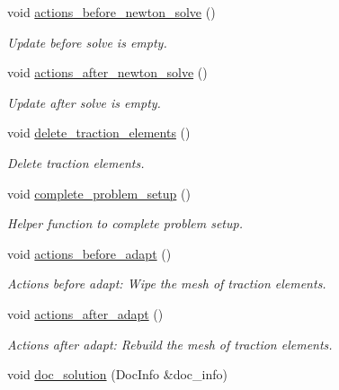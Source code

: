 \begin{DoxyCompactItemize}
void \hyperlink{classFourierDecomposedTimeHarmonicLinearElasticityProblem_ad9a3f48c3b399c4595f73d3f1e9a14ef}{actions\+\_\+before\+\_\+newton\+\_\+solve} ()
\begin{DoxyCompactList}\small\item\em Update before solve is empty. \end{DoxyCompactList}\item 
void \hyperlink{classFourierDecomposedTimeHarmonicLinearElasticityProblem_ac5c25fb4658eaef91104ef7be1b0d25e}{actions\+\_\+after\+\_\+newton\+\_\+solve} ()
\begin{DoxyCompactList}\small\item\em Update after solve is empty. \end{DoxyCompactList}\item 
void \hyperlink{classFourierDecomposedTimeHarmonicLinearElasticityProblem_ad51d1870683e0141c7854c583dd3916b}{delete\+\_\+traction\+\_\+elements} ()
\begin{DoxyCompactList}\small\item\em Delete traction elements. \end{DoxyCompactList}\item 
void \hyperlink{classFourierDecomposedTimeHarmonicLinearElasticityProblem_aeb3e1638026cb1cabf1b16a32496f63c}{complete\+\_\+problem\+\_\+setup} ()
\begin{DoxyCompactList}\small\item\em Helper function to complete problem setup. \end{DoxyCompactList}\item 
void \hyperlink{classFourierDecomposedTimeHarmonicLinearElasticityProblem_a36fdaec8cffb1f6ac313515a86010d8d}{actions\+\_\+before\+\_\+adapt} ()
\begin{DoxyCompactList}\small\item\em Actions before adapt\+: Wipe the mesh of traction elements. \end{DoxyCompactList}\item 
void \hyperlink{classFourierDecomposedTimeHarmonicLinearElasticityProblem_a5b9d18ea43b802e8a2b1f3b50140054b}{actions\+\_\+after\+\_\+adapt} ()
\begin{DoxyCompactList}\small\item\em Actions after adapt\+: Rebuild the mesh of traction elements. \end{DoxyCompactList}\item 
void \hyperlink{classFourierDecomposedTimeHarmonicLinearElasticityProblem_af328e5b2260377fa7df04b727ca130bd}{doc\+\_\+solution} (Doc\+Info \&doc\+\_\+info)

\end{DoxyCompactItemize}
